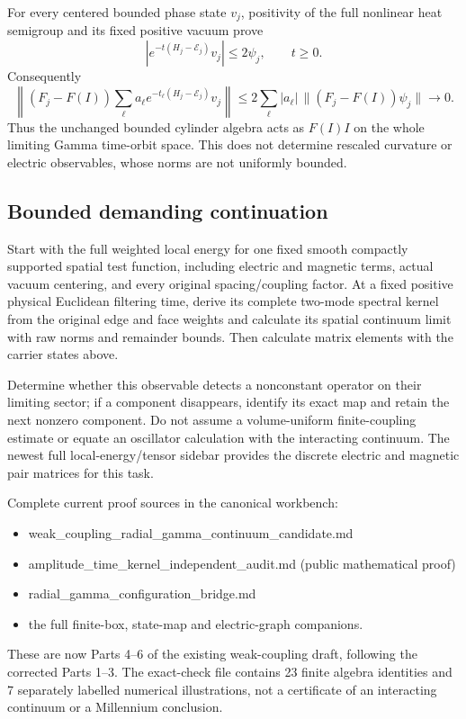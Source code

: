 \documentclass[
  11pt,
]{article}
\providecommand{\tightlist}{%
  \setlength{\itemsep}{0pt}\setlength{\parskip}{0pt}}
\begin{document}
For every centered bounded phase state \(v_j\), positivity of the full
nonlinear heat semigroup and its fixed positive vacuum prove \[
 |e^{-t(H_j-\mathcal E_j)}v_j|\le2\psi_j,\qquad t\ge0.
\] Consequently \[
 \left\|(F_j-F(I))\sum_\ell a_\ell e^{-t_\ell(H_j-\mathcal E_j)}v_j\right\|
 \le2\sum_\ell|a_\ell|\,\|(F_j-F(I))\psi_j\|\longrightarrow0 .
\] Thus the unchanged bounded cylinder algebra acts as \(F(I)I\) on the
whole limiting Gamma time-orbit space. This does not determine rescaled
curvature or electric observables, whose norms are not uniformly
bounded.

\subsection{Bounded demanding
continuation}\label{weak-coupling-part-9-bounded-demanding-continuation}

Start with the full weighted local energy for one fixed smooth compactly
supported spatial test function, including electric and magnetic terms,
actual vacuum centering, and every original spacing/coupling factor. At
a fixed positive physical Euclidean filtering time, derive its complete
two-mode spectral kernel from the original edge and face weights and
calculate its spatial continuum limit with raw norms and remainder
bounds. Then calculate matrix elements with the carrier states above.

Determine whether this observable detects a nonconstant operator on
their limiting sector; if a component disappears, identify its exact map
and retain the next nonzero component. Do not assume a volume-uniform
finite-coupling estimate or equate an oscillator calculation with the
interacting continuum. The newest full local-energy/tensor sidebar
provides the discrete electric and magnetic pair matrices for this task.

Complete current proof sources in the canonical workbench:

\begin{itemize}
\tightlist
\item
  weak\_coupling\_radial\_gamma\_continuum\_candidate.md
\item
  amplitude\_time\_kernel\_independent\_audit.md (public mathematical
  proof)
\item
  radial\_gamma\_configuration\_bridge.md
\item
  the full finite-box, state-map and electric-graph companions.
\end{itemize}

These are now Parts 4--6 of the existing weak-coupling draft, following
the corrected Parts 1--3. The exact-check file contains 23 finite
algebra identities and 7 separately labelled numerical illustrations,
not a certificate of an interacting continuum or a Millennium
conclusion.
\end{document}
